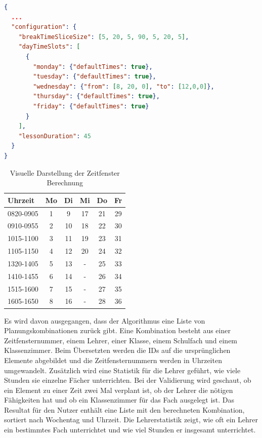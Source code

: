 \begin{lstlisting}[language=JSON, caption=Ausschnitt einer Eingabe für das Stundenplanproblem für die Rahmenbedingungen, label=lst:cat_input_timetableScheduling]  
{
  ...
  "configuration": {
    "breakTimeSliceSize": [5, 20, 5, 90, 5, 20, 5],
    "dayTimeSlots": [
      {
        "monday": {"defaultTimes": true},
        "tuesday": {"defaultTimes": true},
        "wednesday": {"from": [8, 20, 0], "to": [12,0,0]},
        "thursday": {"defaultTimes": true},
        "friday": {"defaultTimes": true}
      }
    ],
    "lessonDuration": 45
  }
}
\end{lstlisting}

\begin{table}[ht]
\centering
  \begin{tabular}{ l | c | c | c | c | c }
	\hline
	\rowcolor{gray}
	\textbf{Uhrzeit} 	& \textbf{Mo}	& \textbf{Di} 	& \textbf{Mi}	&  \textbf{Do}	&  \textbf{Fr}\\ \hline
	0820-0905		& 1			& 9			& 17			& 21			& 29		\\ \hline
	0910-0955		& 2			& 10			& 18			& 22			& 30		\\ \hline
	1015-1100		& 3			& 11			& 19			& 23			& 31		\\ \hline
	1105-1150		& 4			& 12			& 20			& 24			& 32		\\ \hline \hline
	1320-1405		& 5			& 13			& -			& 25			& 33		\\ \hline
	1410-1455		& 6			& 14			& -			& 26			& 34		\\ \hline
	1515-1600		& 7			& 15			& -			& 27			& 35		\\ \hline
	1605-1650		& 8			& 16			& -			& 28			& 36		\\ \hline
  \end{tabular}
   \caption{Visuelle Darstellung der Zeitfenster Berechnung}\label{table:timeslice_calc}
\end{table}

\FloatBarrier

Es wird davon ausgegangen, dass der Algorithmus eine Liste von Planungskombinationen zurück gibt. Eine Kombination besteht aus einer Zeitfensternummer, einem Lehrer, einer Klasse, 
einem Schulfach und einem Klassenzimmer. Beim Übersetzten werden die IDs auf die ursprünglichen Elemente abgebildet und die Zeitfensternummern werden in Uhrzeiten umgewandelt. 
Zusätzlich wird eine Statistik für die Lehrer geführt, wie viele Stunden sie einzelne Fächer unterrichten. Bei der Validierung wird geschaut, ob ein Element zu einer Zeit zwei Mal verplant ist, 
ob der Lehrer die nötigen Fähigkeiten hat und ob ein Klassenzimmer für das Fach ausgelegt ist. Das Resultat für den Nutzer enthält eine Liste mit den berechneten Kombination, sortiert nach 
Wochentag und Uhrzeit. Die Lehrerstatistik zeigt, wie oft ein Lehrer ein bestimmtes Fach unterrichtet und wie viel Stunden er insgesamt unterrichtet.

